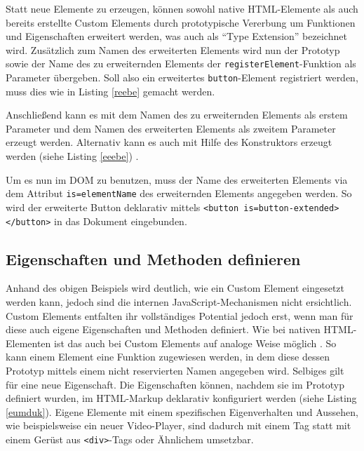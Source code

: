 Statt neue Elemente zu erzeugen, können sowohl native \ac{HTML}-Elemente als auch bereits erstellte Custom Elements durch prototypische Vererbung um Funktionen und Eigenschaften erweitert werden, was auch als ``Type Extension'' bezeichnet wird. Zusätzlich zum Namen des erweiterten Elements wird nun der Prototyp sowie der Name des zu erweiternden Elements der \texttt{registerElement}-Funktion als Parameter übergeben. Soll also ein erweitertes \texttt{button}-Element registriert werden, muss dies wie in Listing \ref{reebe} gemacht werden.



Anschließend kann es mit dem Namen des zu erweiternden Elements als erstem Parameter und dem Namen des erweiterten Elements als zweitem Parameter erzeugt werden. Alternativ kann es auch mit Hilfe des Konstruktors erzeugt werden (siehe Listing \ref{eeebe}) \cite{citeulike:13752379}.



Um es nun im \ac{DOM} zu benutzen, muss der Name des erweiterten Elements via dem Attribut \texttt{is=\dq elementName\dq} des erweiternden Elements angegeben werden. So wird der erweiterte Button deklarativ mittels \texttt{\textless{}button\ is=\dq button-extended\dq\textgreater{}\textless{}/button\textgreater{}} in das Dokument eingebunden.


\subsection{Eigenschaften und Methoden definieren}\label{eigenschaften-und-methoden-definieren}

Anhand des obigen Beispiels wird deutlich, wie ein Custom Element eingesetzt werden kann, jedoch sind die internen JavaScript-Mechanismen nicht ersichtlich. Custom Elements entfalten ihr vollständiges Potential jedoch erst, wenn man für diese auch eigene Eigenschaften und Methoden definiert. Wie bei nativen \ac{HTML}-Elementen ist das auch bei Custom Elements auf analoge Weise möglich \cite[S. 127-138]{citeulike:13844975}. So kann einem Element eine Funktion zugewiesen werden, in dem diese dessen Prototyp mittels einem nicht reservierten Namen angegeben wird. Selbiges gilt für eine neue Eigenschaft. Die Eigenschaften können, nachdem sie im Prototyp definiert wurden, im \ac{HTML}-Markup deklarativ konfiguriert werden (siehe Listing \ref{eumduk}). Eigene Elemente mit einem spezifischen Eigenverhalten und Aussehen, wie beispielsweise ein neuer Video-Player, sind dadurch mit einem Tag statt mit einem Gerüst aus \texttt{\textless{}div\textgreater{}}-Tags oder Ähnlichem umsetzbar.

